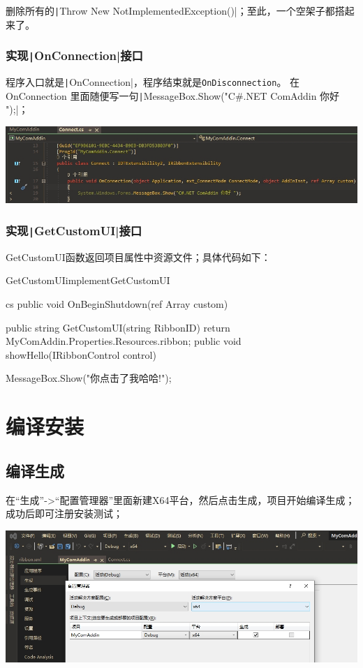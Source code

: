 \documentclass[math,code]{amznotes}
\begin{document}
	删除所有的\texttt|Throw New NotImplementedException()|；至此，一个空架子都搭起来了。
	\subsection{实现\texttt|OnConnection|接口}
	程序入口就是\texttt|OnConnection|，程序结束就是\texttt{OnDisconnection}。
	在OnConnection 里面随便写一句\texttt|MessageBox.Show("C#.NET ComAddin 你好 ");|；
	
	\includegraphics[width=0.9\linewidth]{pic/OnConnection}
	
	\subsection{实现\texttt|GetCustomUI|接口}\label{sec:implement_GetCustomUI}
	GetCustomUI函数返回项目属性中资源文件；具体代码如下：
	\begin{codebox}{GetCustomUI}{implementGetCustomUI}
		\begin{amzcode}{cs}
			public void OnBeginShutdown(ref Array custom)
			{
			}
			
			public string GetCustomUI(string RibbonID)
			{
				return MyComAddin.Properties.Resources.ribbon;
			}
			public void showHello(IRibbonControl control)
			{
				
				MessageBox.Show("你点击了我哈哈!");
			}
		\end{amzcode}
	\end{codebox}
	
	\chapter{编译安装}
	
	\section{编译生成}
	在“生成”->“配置管理器”里面新建X64平台，然后点击生成，项目开始编译生成；成功后即可注册安装测试；
	
	\includegraphics[width=0.9\linewidth]{pic/compileX64}
	
\end{document}
